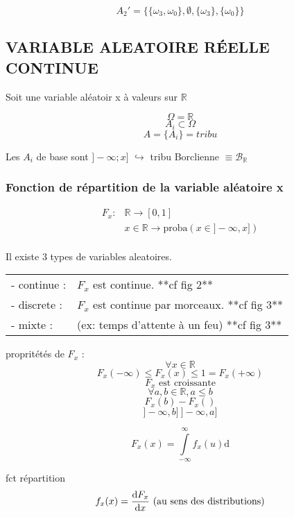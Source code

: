 \documentclass[]{article}
\begin{document}
\begin{displaymath}
A_2' = \{\{\omega_3,\omega_0\},\emptyset,\{\omega_3\},\{\omega_0\}\}
\end{displaymath}

\subsection{VARIABLE ALEATOIRE RÉELLE CONTINUE}

Soit une variable aléatoir x à valeurs sur $\mathbb{R}$

\[ \Omega = \mathbb{R} \] \[ A_i \subset \Omega \]
\[ A = \{A_i\} = tribu \]

Les $A_i$ de base sont $]-\infty ; x ]$ $\hookrightarrow$ tribu
Borclienne $\equiv \mathcal{B}_{\mathbb{R}}$

\subsubsection{Fonction de répartition de la variable aléatoire x}

\begin{displaymath}
\begin{array}{rl}
F_x : &\mathbb{R} \rightarrow [0,1] \\
&x \in \mathbb{R} \rightarrow \text{proba} (x \in ]-\infty, x]) \\
\end{array}
\end{displaymath}

Il existe 3 types de variables aleatoires.

\begin{tabular}{l l}
- continue : &$F_x$ est continue. **cf fig 2** \\
- discrete : &$F_x$ est continue par morceaux. **cf fig 3** \\
- mixte : &(ex: temps d'attente à un feu) **cf fig 3** \\
\end{tabular}

propritétés de $F_x$ : \[\forall x \in \mathbb{R}\]
\[F_x (-\infty) \leq F_x (x) \leq 1 = F_x (+\infty)\]
\[F_x \text{ est croissante}\] \[\forall a, b \in \mathbb{R}, a \leq b\]
\[F_x(b) - F_x()\] \[]-\infty, b] \  ]-\infty, a]\]

\[F_x(x) = \int\limits_{-\infty}^{\infty} f_x (u) \mathrm{d}\]

fct répartition
\[f_x (x) = \frac{\mathrm{d} F_x}{\mathrm{d}x} \text{ (au sens des distributions)}\]
\end{document}

